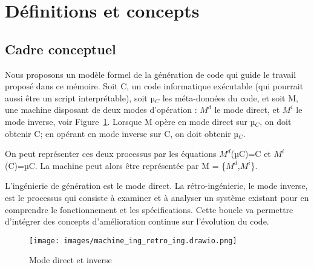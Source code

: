 


\section{Définitions et concepts}

\subsection{Cadre conceptuel} \label{subsection_cadre_conceptuel}

Nous proposons un modèle formel de la génération de code qui guide le travail proposé dans ce mémoire. Soit C, un code informatique exécutable (qui pourrait aussi être un script interprétable), soit µ$_C$ les méta-données du code, et soit M, une machine disposant de deux modes d’opération : $M^d$ le mode direct, et $M^i$ le mode inverse, voir Figure~\ref{fig:mode_direct_inverse}. Lorsque M opère en mode direct sur µ$_C$, on doit obtenir C; en opérant en mode inverse sur C, on doit obtenir µ$_C$.

On peut représenter ces deux processus par les équations $M^d$(µC)=C et $M^i$(C)=µC. La machine peut alors être représentée par M = \{$M^d$,$M^i$\}.

L’ingénierie de génération est le mode direct. La rétro-ingénierie, le mode inverse, est le processus qui consiste à examiner et à analyser un système existant pour en comprendre le fonctionnement et les spécifications. Cette boucle va permettre d’intégrer des concepts d’amélioration continue sur l’évolution du code.

\begin{figure}[htb]
\centering
\texttt{[image: images/machine\_ing\_retro\_ing.drawio.png]}
\caption{Mode direct et inverse}
\label{fig:mode_direct_inverse}
\end{figure}

